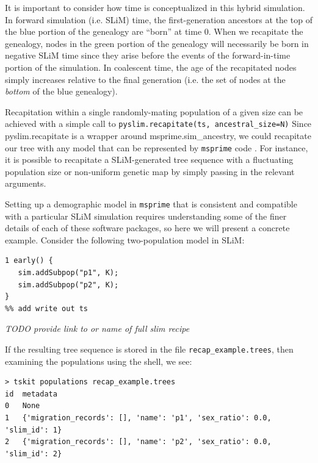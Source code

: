 \documentclass[12pt]{article}
\newcommand{\msprime}[0]{\texttt{msprime}\xspace}
\newcommand{\comment}[1]{\textit{\color{green} #1}}
\begin{document}
It is important to consider how time is conceptualized in this hybrid simulation. In forward simulation (i.e. SLiM) time,
the first-generation ancestors at the top of the blue portion of the genealogy are ``born'' at time 0. When we recapitate the genealogy,
nodes in the green portion of the genealogy will necessarily be born in negative SLiM time since they arise before the events of the
forward-in-time portion of the simulation. In coalescent time, the age of the recapitated nodes simply increases relative to the final generation
(i.e. the set of nodes at the \textit{bottom} of the blue genealogy). %

Recapitation within a single randomly-mating population of a given size
can be achieved with a simple call to \verb|pyslim.recapitate(ts, ancestral_size=N)|
Since pyslim.recapitate is a wrapper around
msprime.sim\_ancestry, we could recapitate our tree with any model that can be represented by \msprime code
\citep{baumdicker_efficient_2022}. For instance, it is possible to recapitate a SLiM-generated tree sequence with a fluctuating population size
or non-uniform genetic map by simply passing in the relevant arguments.

Setting up a demographic model in \msprime that is consistent and compatible with a particular SLiM simulation requires
understanding some of the finer details of each of these software packages, so here we will present a concrete example.
Consider the following two-population model in SLiM:

\begin{verbatim}
1 early() {
   sim.addSubpop("p1", K);
   sim.addSubpop("p2", K);
}
%% add write out ts
\end{verbatim}
\comment{TODO provide link to or name of full slim recipe}

If the resulting tree sequence is stored in the file \texttt{recap\_example.trees},
then examining the populations using the shell, we see:
\begin{verbatim}
> tskit populations recap_example.trees
id	metadata
0	None
1	{'migration_records': [], 'name': 'p1', 'sex_ratio': 0.0, 'slim_id': 1}
2	{'migration_records': [], 'name': 'p2', 'sex_ratio': 0.0, 'slim_id': 2}
\end{verbatim}
\end{document}

